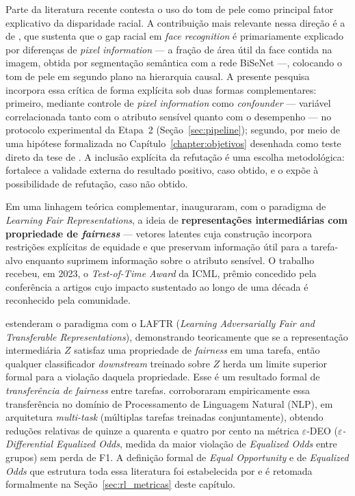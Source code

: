 Parte da literatura recente contesta o uso do tom de pele como principal fator explicativo da disparidade racial. A contribuição mais relevante nessa direção é a de , que sustenta que o gap racial em \emph{face recognition} é primariamente explicado por diferenças de \emph{pixel information} --- a fração de área útil da face contida na imagem, obtida por segmentação semântica com a rede BiSeNet ---, colocando o tom de pele em segundo plano na hierarquia causal. A presente pesquisa incorpora essa crítica de forma explícita sob duas formas complementares: primeiro, mediante controle de \emph{pixel information} como \emph{confounder} --- variável correlacionada tanto com o atributo sensível quanto com o desempenho --- no protocolo experimental da Etapa~2 (Seção~\ref{sec:pipeline}); segundo, por meio de uma hipótese formalizada no Capítulo~\ref{chapter:objetivos} desenhada como teste direto da tese de . A inclusão explícita da refutação é uma escolha metodológica: fortalece a validade externa do resultado positivo, caso obtido, e o expõe à possibilidade de refutação, caso não obtido.

Em uma linhagem teórica complementar,  inauguraram, com o paradigma de \emph{Learning Fair Representations}, a ideia de \textbf{representações intermediárias com propriedade de \emph{fairness}} --- vetores latentes cuja construção incorpora restrições explícitas de equidade e que preservam informação útil para a tarefa-alvo enquanto suprimem informação sobre o atributo sensível. O trabalho recebeu, em 2023, o \emph{Test-of-Time Award} da ICML, prêmio concedido pela conferência a artigos cujo impacto sustentado ao longo de uma década é reconhecido pela comunidade.

 estenderam o paradigma com o LAFTR (\emph{Learning Adversarially Fair and Transferable Representations}), demonstrando teoricamente que se a representação intermediária $Z$ satisfaz uma propriedade de \emph{fairness} em uma tarefa, então qualquer classificador \emph{downstream} treinado sobre $Z$ herda um limite superior formal para a violação daquela propriedade. Esse é um resultado formal de \emph{transferência de fairness} entre tarefas.  corroboraram empiricamente essa transferência no domínio de Processamento de Linguagem Natural (NLP), em arquitetura \emph{multi-task} (múltiplas tarefas treinadas conjuntamente), obtendo reduções relativas de quinze a quarenta e quatro por cento na métrica $\varepsilon$-DEO (\emph{$\varepsilon$-Differential Equalized Odds}, medida da maior violação de \emph{Equalized Odds} entre grupos) sem perda de F1. A definição formal de \emph{Equal Opportunity} e de \emph{Equalized Odds} que estrutura toda essa literatura foi estabelecida por  e é retomada formalmente na Seção~\ref{sec:rl_metricas} deste capítulo.

